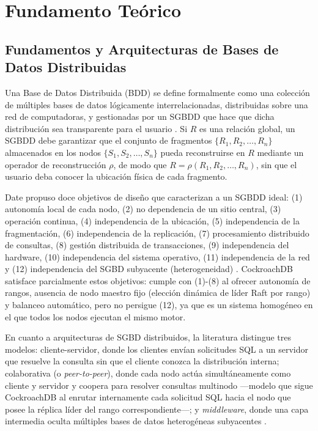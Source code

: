 \documentclass[10pt,letterpaper]{article}
\begin{document}
\section{Fundamento Teórico}

\subsection{Fundamentos y Arquitecturas de Bases de Datos Distribuidas}

Una Base de Datos Distribuida (BDD) se define formalmente como una colección de múltiples bases de datos lógicamente interrelacionadas, distribuidas sobre una red de computadoras, y gestionadas por un SGBDD que hace que dicha distribución sea transparente para el usuario \citep{ozsu2020}. Si $R$ es una relación global, un SGBDD debe garantizar que el conjunto de fragmentos $\{R_1, R_2, \dots, R_n\}$ almacenados en los nodos $\{S_1, S_2, \dots, S_n\}$ pueda reconstruirse en $R$ mediante un operador de reconstrucción $\rho$, de modo que $R = \rho(R_1, R_2, \dots, R_n)$, sin que el usuario deba conocer la ubicación física de cada fragmento.

Date propuso doce objetivos de diseño que caracterizan a un SGBDD ideal: (1) autonomía local de cada nodo, (2) no dependencia de un sitio central, (3) operación continua, (4) independencia de la ubicación, (5) independencia de la fragmentación, (6) independencia de la replicación, (7) procesamiento distribuido de consultas, (8) gestión distribuida de transacciones, (9) independencia del hardware, (10) independencia del sistema operativo, (11) independencia de la red y (12) independencia del SGBD subyacente (heterogeneidad) \citep{ozsu2020}. CockroachDB satisface parcialmente estos objetivos: cumple con (1)-(8) al ofrecer autonomía de rangos, ausencia de nodo maestro fijo (elección dinámica de líder Raft por rango) y balanceo automático, pero no persigue (12), ya que es un sistema homogéneo en el que todos los nodos ejecutan el mismo motor.

En cuanto a arquitecturas de SGBD distribuidos, la literatura distingue tres modelos: cliente-servidor, donde los clientes envían solicitudes SQL a un servidor que resuelve la consulta sin que el cliente conozca la distribución interna; colaborativa (o \textit{peer-to-peer}), donde cada nodo actúa simultáneamente como cliente y servidor y coopera para resolver consultas multinodo —modelo que sigue CockroachDB al enrutar internamente cada solicitud SQL hacia el nodo que posee la réplica líder del rango correspondiente—; y \textit{middleware}, donde una capa intermedia oculta múltiples bases de datos heterogéneas subyacentes \citep{ozsu2020}.
\end{document}

